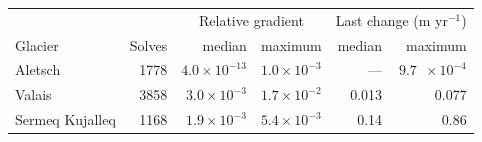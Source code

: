 \begin{tabular*}{\linewidth}{@{\extracolsep{\fill}}lrrrrr@{}}
\toprule
 & & \multicolumn{2}{c}{Relative gradient} & \multicolumn{2}{c}{Last change (m yr$^{-1}$)}\\
Glacier & Solves & median & maximum & median & maximum\\
\midrule
Aletsch & 1778 & $4.0\times10^{-13}$ & $1.0\times10^{-3}$ & --- & $9.7\phantom{0}\times10^{-4}$ \\
Valais & 3858 & $3.0\times10^{-3}$ & $1.7\times10^{-2}$ & 0.013 & 0.077 \\
Sermeq Kujalleq & 1168 & $1.9\times10^{-3}$ & $5.4\times10^{-3}$ & 0.14 & 0.86 \\
\bottomrule
\end{tabular*}
